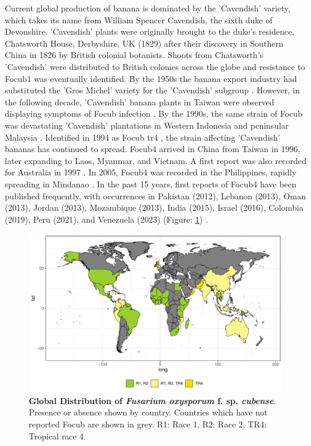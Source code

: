 Current global production of banana is dominated by the 'Cavendish' variety, which takes its name from William Spencer Cavendish, the sixth duke of Devonshire. 'Cavendish' plants were originally brought to the duke's residence, Chatsworth House, Derbyshire, UK (1829) after their discovery in Southern China in 1826 by British colonial botanists. Shoots from Chatsworth's 'Cavendish' were distributed to British colonies across the globe and resistance to \ac{Focub1} was eventually identified. By the 1950s the banana export industry had substituted the 'Gros Michel' variety for the 'Cavendish' subgroup \parencite{Ploetz2005, Dita2018}. However, in the following decade, 'Cavendish' banana plants in Taiwan were observed displaying symptoms of \ac{Focub} infection \parencite{Agrios2005}. By the 1990s, the same strain of \ac{Focub} was devastating 'Cavendish' plantations in Western Indonesia and peninsular Malaysia \parencite{Kema2021}. Identified in 1994 as \ac{Focub} \ac{tr4} \parencite{Ploetz1994}, the strain affecting 'Cavendish' bananas has continued to spread. \Ac{Focub4} arrived in China from Taiwan in 1996, later expanding to Laos, Myanmar, and Vietnam. A first report was also recorded for Australia in 1997 \parencite{Ploetz2015a}. In 2005, \ac{Focub4} was recorded in the Philippines, rapidly spreading in Mindanao \parencite{Molina2009}. In the past 15 years, first reports of \ac{Focub4} have been published frequently, with occurrences in Pakistan (2012), Lebanon (2013), Oman (2013), Jordan (2013), Mozambique (2013), India (2015), Israel (2016), Colombia (2019), Peru (2021), and Venezuela (2023) (Figure: \ref{fig:FocDis}) \parencite{Butler2013, Ploetz2015a, Ordonez2015, Zheng2018, Thangavelu2019, Garcia-Bastida2020, Maymon2020, Kema2021, Acuna2022,  Herrera2023}.

\begin{figure}[hb!]
  \includegraphics[width=14.5cm]{Figures/FocDis.pdf}
  \caption[Global Distribution of \textit{Fusarium oxysporum} f. sp. \textit{cubense}]{\textbf{Global Distribution of \textit{Fusarium oxysporum} f. sp. \textit{cubense}}. Presence or absence shown by country. Countries which have not reported \ac{Focub} are shown in grey. R1: Race 1, R2: Race 2, TR4: Tropical race 4.}
  \label{fig:FocDis}
\end{figure}

